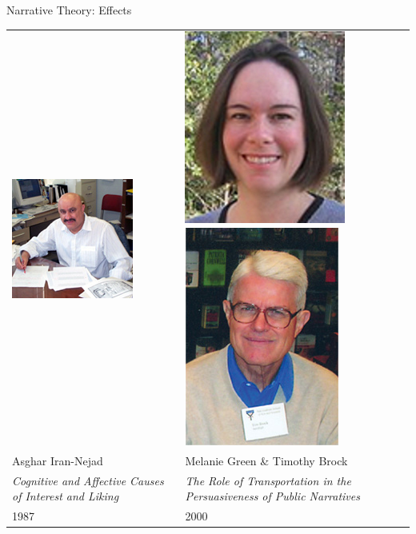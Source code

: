 \documentclass[xcolor=x11names]{beamer}
\newcommand{\work}[1]{\textit{#1}\xspace}
\begin{document}
\begin{frame}{Narrative Theory: Effects}
  \begin{tabular}{C{0.45\textwidth} C{0.45\textwidth}}
    \includegraphics[height=0.3\textwidth]{res/iran-nejad.jpg} &
    \includegraphics[height=0.3\textwidth]{res/green.jpg} \hspace*{2pt}
    \includegraphics[height=0.3\textwidth]{res/brock.jpg} \\
    Asghar Iran-Nejad & Melanie Green \& Timothy Brock \\
    \work{Cognitive and Affective Causes of Interest and Liking} & \work{The Role of Transportation in the Persuasiveness of Public Narratives} \\
    1987 & 2000 \\
  \end{tabular}
\end{frame}
\end{document}
